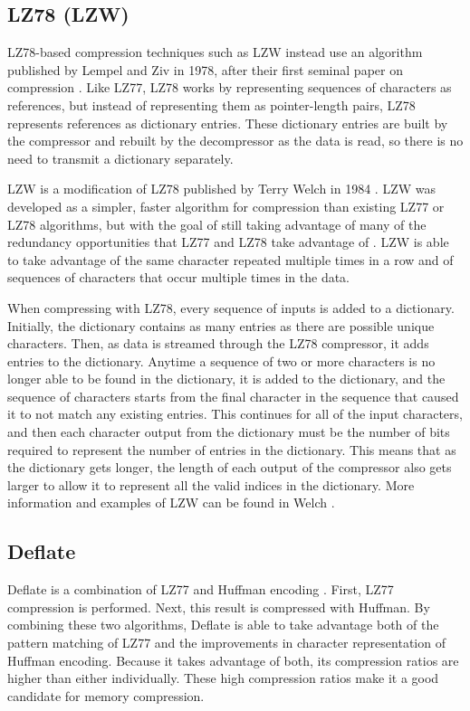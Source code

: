 \documentclass[doublespace,nopageskip]{VTthesis}
\begin{document}
\subsection{LZ78 (LZW)}\label{ss:lz78}
LZ78-based compression techniques such as LZW instead use an algorithm published by Lempel and Ziv in 1978, after their first seminal paper on compression \cite{lz78}. Like LZ77, LZ78 works by representing sequences of characters as references, but instead of representing them as pointer-length pairs, LZ78 represents references as dictionary entries. These dictionary entries are built by the compressor and rebuilt by the decompressor as the data is read, so there is no need to transmit a dictionary separately.

LZW is a modification of LZ78 published by Terry Welch in 1984 \cite{lzw}. LZW was developed as a simpler, faster algorithm for compression than existing LZ77 or LZ78 algorithms, but with the goal of still taking advantage of many of the redundancy opportunities that LZ77 and LZ78 take advantage of \cite{lzw}. LZW is able to take advantage of the same character repeated multiple times in a row and of sequences of characters that occur multiple times in the data.

When compressing with LZ78, every sequence of inputs is added to a dictionary. Initially, the dictionary contains as many entries as there are possible unique characters. Then, as data is streamed through the LZ78 compressor, it adds entries to the dictionary. Anytime a sequence of two or more characters is no longer able to be found in the dictionary, it is added to the dictionary, and the sequence of characters starts from the final character in the sequence that caused it to not match any existing entries. This continues for all of the input characters, and then each character output from the dictionary must be the number of bits required to represent the number of entries in the dictionary. This means that as the dictionary gets longer, the length of each output of the compressor also gets larger to allow it to represent all the valid indices in the dictionary. More information and examples of LZW can be found in Welch \cite{lzw}.

\subsection{Deflate}\label{ss:deflate}
Deflate is a combination of LZ77 and Huffman encoding \cite{deflate}. First, LZ77 compression is performed. Next, this result is compressed with Huffman. By combining these two algorithms, Deflate is able to take advantage both of the pattern matching of LZ77 and the improvements in character representation of Huffman encoding. Because it takes advantage of both, its compression ratios are higher than either individually. These high compression ratios make it a good candidate for memory compression.
\end{document}
